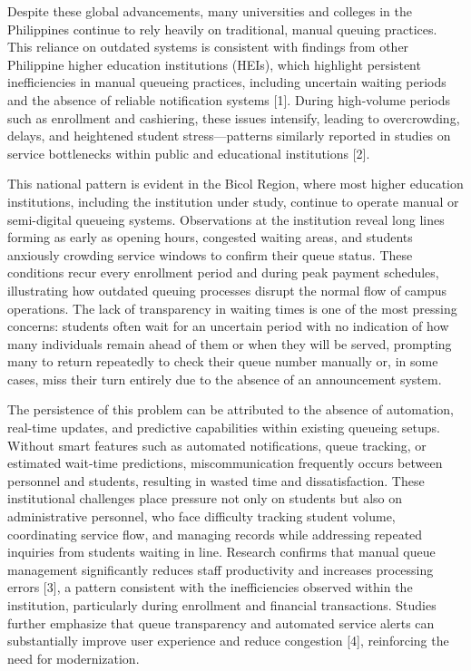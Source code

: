 \documentclass{research}
\begin{document}
Despite these global advancements, many universities and colleges in the Philippines continue to rely heavily on traditional, manual queuing practices. This reliance on outdated systems is consistent with findings from other Philippine higher education institutions (HEIs), which highlight persistent inefficiencies in manual queueing practices, including uncertain waiting periods and the absence of reliable notification systems [1]. During high-volume periods such as enrollment and cashiering, these issues intensify, leading to overcrowding, delays, and heightened student stress—patterns similarly reported in studies on service bottlenecks within public and educational institutions [2].

This national pattern is evident in the Bicol Region, where most higher education institutions, including the institution under study, continue to operate manual or semi-digital queueing systems. Observations at the institution reveal long lines forming as early as opening hours, congested waiting areas, and students anxiously crowding service windows to confirm their queue status. These conditions recur every enrollment period and during peak payment schedules, illustrating how outdated queuing processes disrupt the normal flow of campus operations. The lack of transparency in waiting times is one of the most pressing concerns: students often wait for an uncertain period with no indication of how many individuals remain ahead of them or when they will be served, prompting many to return repeatedly to check their queue number manually or, in some cases, miss their turn entirely due to the absence of an announcement system.

The persistence of this problem can be attributed to the absence of automation, real-time updates, and predictive capabilities within existing queueing setups. Without smart features such as automated notifications, queue tracking, or estimated wait-time predictions, miscommunication frequently occurs between personnel and students, resulting in wasted time and dissatisfaction. These institutional challenges place pressure not only on students but also on administrative personnel, who face difficulty tracking student volume, coordinating service flow, and managing records while addressing repeated inquiries from students waiting in line. Research confirms that manual queue management significantly reduces staff productivity and increases processing errors [3], a pattern consistent with the inefficiencies observed within the institution, particularly during enrollment and financial transactions. Studies further emphasize that queue transparency and automated service alerts can substantially improve user experience and reduce congestion [4], reinforcing the need for modernization.
\end{document}
